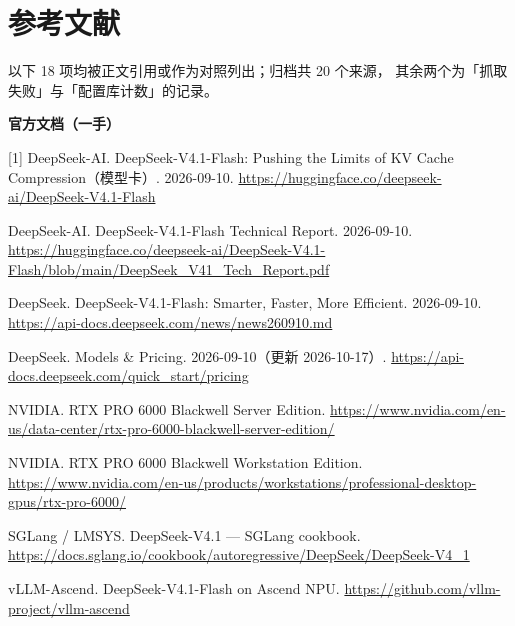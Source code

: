﻿%
\section*{参考文献}
\begin{refs}
\footnotesize
\setlength{\parindent}{0pt}
\setlength{\parskip}{2.5pt}

\noindent 以下 18 项均被正文引用或作为对照列出；归档共 20 个来源，
其余两个为「抓取失败」与「配置库计数」的记录。\par
\vspace{4pt}

\noindent\textbf{官方文档（一手）}\par
\vspace{2pt}
[1] DeepSeek-AI. DeepSeek-V4.1-Flash: Pushing the Limits of KV Cache Compression（模型卡）. 2026-09-10. \url{https://huggingface.co/deepseek-ai/DeepSeek-V4.1-Flash}\par
[2] DeepSeek-AI. DeepSeek-V4.1-Flash Technical Report. 2026-09-10. \url{https://huggingface.co/deepseek-ai/DeepSeek-V4.1-Flash/blob/main/DeepSeek_V41_Tech_Report.pdf}\par
[3] DeepSeek. DeepSeek-V4.1-Flash: Smarter, Faster, More Efficient. 2026-09-10. \url{https://api-docs.deepseek.com/news/news260910.md}\par
[4] DeepSeek. Models \& Pricing. 2026-09-10（更新 2026-10-17）. \url{https://api-docs.deepseek.com/quick_start/pricing}\par
[5] NVIDIA. RTX PRO 6000 Blackwell Server Edition. \url{https://www.nvidia.com/en-us/data-center/rtx-pro-6000-blackwell-server-edition/}\par
[6] NVIDIA. RTX PRO 6000 Blackwell Workstation Edition. \url{https://www.nvidia.com/en-us/products/workstations/professional-desktop-gpus/rtx-pro-6000/}\par
[7] SGLang / LMSYS. DeepSeek-V4.1 --- SGLang cookbook. \url{https://docs.sglang.io/cookbook/autoregressive/DeepSeek/DeepSeek-V4_1}\par
[8] vLLM-Ascend. DeepSeek-V4.1-Flash on Ascend NPU. \url{https://github.com/vllm-project/vllm-ascend}\par
\vspace{5pt}


\end{refs}
